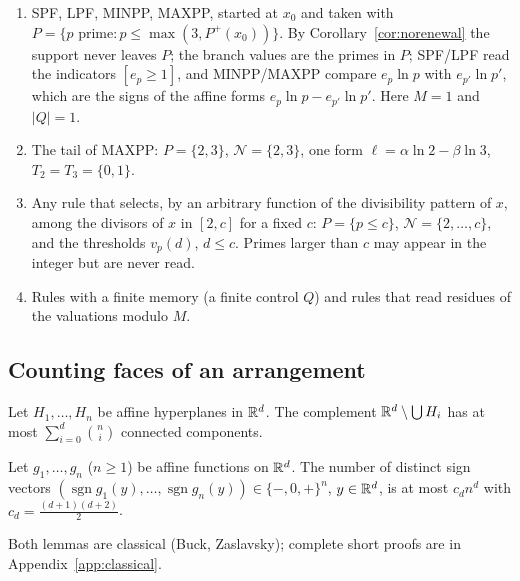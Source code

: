 \begin{example}\label{ex:members}
\begin{enumerate}[label=(\roman*),itemsep=1pt]
\item \textsf{SPF}, \textsf{LPF}, \textsf{MINPP}, \textsf{MAXPP}, started at $x_0$ and taken with $P=\{p\text{ prime}:p\le\max(3,P^+(x_0))\}$. By Corollary~\ref{cor:norenewal} the support never leaves $P$; the branch values are the primes in $P$; \textsf{SPF}/\textsf{LPF} read the indicators $[e_p\ge1]$, and \textsf{MINPP}/\textsf{MAXPP} compare $e_p\ln p$ with $e_{p'}\ln p'$, which are the signs of the affine forms $e_p\ln p-e_{p'}\ln p'$. Here $M=1$ and $|Q|=1$.
\item The tail of \textsf{MAXPP}: $P=\{2,3\}$, $\mathcal N=\{2,3\}$, one form $\ell=\alpha\ln2-\beta\ln3$, $T_2=T_3=\{0,1\}$.
\item Any rule that selects, by an arbitrary function of the divisibility pattern of $x$, among the divisors of $x$ in $[2,c]$ for a fixed $c$: $P=\{p\le c\}$, $\mathcal N=\{2,\dots,c\}$, and the thresholds $v_p(d)$, $d\le c$. Primes larger than $c$ may appear in the integer but are never read.
\item Rules with a finite memory (a finite control $Q$) and rules that read residues of the valuations modulo $M$.
\end{enumerate}
\end{example}

\subsection{Counting faces of an arrangement}
\begin{lemma}\label{lem:regions}
Let $H_1,\dots,H_n$ be affine hyperplanes in $\mathbb{R}^d$. The complement $\mathbb{R}^d\setminus\bigcup H_i$ has at most $\sum_{i=0}^{d}\binom ni$ connected components.
\end{lemma}
\begin{lemma}\label{lem:faces}
Let $g_1,\dots,g_n$ ($n\ge1$) be affine functions on $\mathbb{R}^d$. The number of distinct sign vectors $(\operatorname{sgn}g_1(y),\dots,\operatorname{sgn}g_n(y))\in\{-,0,+\}^n$, $y\in\mathbb{R}^d$, is at most $c_dn^d$ with $c_d=\frac{(d+1)(d+2)}2$.
\end{lemma}
Both lemmas are classical (Buck, Zaslavsky); complete short proofs are in Appendix~\ref{app:classical}.

